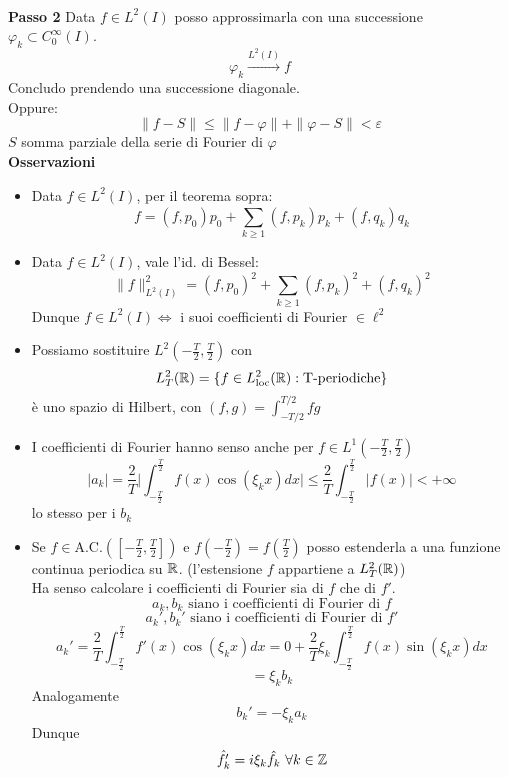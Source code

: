 \\\textbf{Passo 2} Data $f\in L^{2}(I)$ posso approssimarla con una successione $\varphi_k \subset C_0^\infty(I)$.
\[\varphi_k\xrightarrow{L^{2}(I)}f\]
Concludo prendendo una successione diagonale.
\\Oppure:
\[\|f-S\|\le \|f-\varphi\|+\|\varphi-S\|<\varepsilon\]
$S$ somma parziale della serie di Fourier di $\varphi$ 
\\\textbf{Osservazioni}
\begin{itemize}
	\item Data $f\in L^{2}(I)$, per il teorema sopra:
		\[f=(f,p_0)p_0+\sum_{k\ge 1}^{} (f,p_k)p_k+(f,q_k)q_k\]
	\item Data $f\in L^{2}(I)$, vale l'id. di Bessel:
		\[\|f\|_{L^{2}(I)}^2=(f,p_0)^2+\sum_{k\ge 1}^{} (f,p_k)^2+(f,q_k)^2\]
		Dunque $f\in L^{2}(I) \iff $ i suoi coefficienti di Fourier $\in \ell^2$ 
	\item Possiamo sostituire $L^{2}(-\frac{T}{2},\frac{T}{2})$ con 
		\[ L^{2}_T(\mathbb{R})=\{f\in L_{\text{loc}}^2(\mathbb{R}):\text{T-periodiche}\} \]
		è uno spazio di Hilbert, con $(f,g)=\int_{-T / 2}^{T / 2} fg $ 
	\item I coefficienti di Fourier hanno senso anche per $f\in L^{1}(-\frac{T}{2},\frac{T}{2})$ 
		\[|a_k|=\frac{2}{T}\bigg|\int_{-\frac{T}{2}}^{\frac{T}{2}}f(x)\cos(\xi_kx)dx\bigg|\le \frac{2}{T } \int_{-\frac{T}{2}}^{\frac{T}{2}} |f(x)|<+\infty\]
		lo stesso per i $b_k$ 
	\item Se $f\in \text{A.C.}([-\frac{T}{2},\frac{T}{2}])$ e $f(-\frac{T}{2})=f(\frac{T}{2})$ posso estenderla a una funzione continua periodica su $\mathbb{R}$. (l'estensione $f$ appartiene a $L_T^2(\mathbb{R})$)
		\\Ha senso calcolare i coefficienti di Fourier sia di $f$ che di $f'$.
		\[a_k,b_k\text{ siano i coefficienti di Fourier di }f\]
		\[a_k',b_k'\text{ siano i coefficienti di Fourier di }f'\]
\[a_k'=\frac{2}{T} \int_{-\frac{T}{2}}^{\frac{T}{2}} f'(x)\cos(\xi_kx)dx=0+\frac{2}{T}\xi_k \int_{-\frac{T}{2}}^{\frac{T}{2}} f(x)\sin(\xi_kx)dx\]
\[=\xi_kb_k\]
Analogamente
\[b_k'=-\xi_ka_k\]
Dunque
\[\hat{f_k'}=i\xi_k \hat{f_k}\ \forall k\in \mathbb{Z}\]

\end{itemize}
